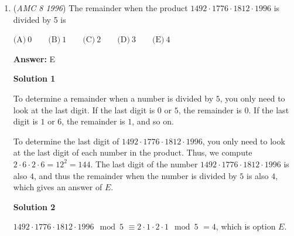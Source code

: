 \begin{enumerate}
$\text{(A)}\ 27 \qquad \text{(B)}\ 29 \qquad \text{(C)}\ 31 \qquad \text{(D)}\ 33 \qquad \text{(E)}\ 35$

 \textbf{Answer: }B



\textbf{Solution}

Looking at the vertical column, the three numbers sum to $23$.  If we make the numbers on either end $9$ and $8$ in some order, the middle number will be $6$.  This is the minimum for the intersection.

 Looking at the horizontal row, the four numbers sum to $12$.  If we minimize the three numbers on the right to $123$, the first number has a maximum value of $6$.  This is the maximum for the intersection

 Thus, the minimum of the intersection is $6$, and the maximum of the intersection is $6$.  This means the intersection must be $6$, and the other numbers must be $9$ and $8$ in the column, and $123$ in the row.  The sum of all the numbers is $12 + 23 - 6 = \boxed{\text{(B)}\ 29}$.

 


 


	\item (\textit{AMC 8 1996}) The remainder when the product $1492\cdot 1776\cdot 1812\cdot 1996$ is divided by 5 is


 $\text{(A)}\ 0 \qquad \text{(B)}\ 1 \qquad \text{(C)}\ 2 \qquad \text{(D)}\ 3 \qquad \text{(E)}\ 4$

 \textbf{Answer: }E



\textbf{Solution 1}

To determine a remainder when a number is divided by $5$, you only need to look at the last digit.  If the last digit is $0$ or $5$, the remainder is $0$.  If the last digit is $1$ or $6$, the remainder is $1$, and so on.

 To determine the last digit of $1492\cdot 1776\cdot 1812\cdot 1996$, you only need to look at the last digit of each number in the product.  Thus, we compute $2\cdot 6\cdot 2\cdot 6 = 12^2 = 144$.  The last digit of the number $1492\cdot 1776\cdot 1812\cdot 1996$ is also $4$, and thus the remainder when the number is divided by $5$ is also $4$, which gives an answer of $\boxed{E}$.

 



\textbf{Solution 2}

$1492\cdot 1776\cdot 1812\cdot 1996 \mod 5$
$\equiv 2\cdot 1\cdot 2\cdot 1 \mod 5$
$=4$, which is option $\boxed{E}$.


\end{enumerate}
